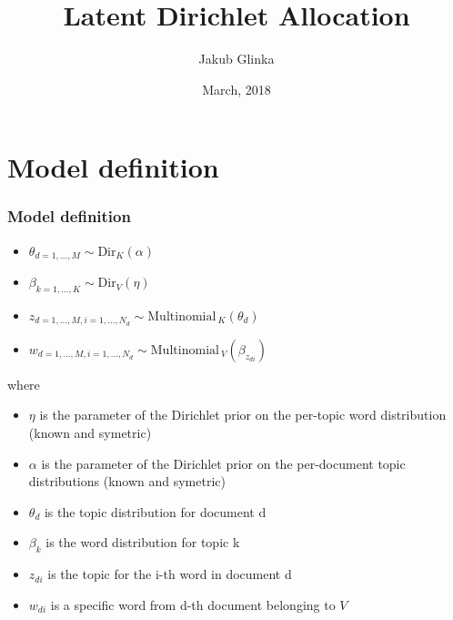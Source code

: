\documentclass[10pt]{beamer}
\title{Latent Dirichlet Allocation}
\author{Jakub Glinka}
\date{March, 2018}
\begin{document}

\begin{frame}
\titlepage
\end{frame}


\section{Model definition}


\begin{frame}
\frametitle{Model definition}

\begin{itemize}
 \item $\theta_{d=1,...,M} \sim \mathrm{Dir}_K(\alpha)$
 \item $\beta_{k=1,...,K} \sim \mathrm{Dir}_V(\eta)$
 \item $z_{d=1,...,M,i=1,...,N_d} \sim \mathrm{Multinomial}_{ \ K}(\theta_d)$
 \item $w_{d=1,...,M,i=1,...,N_d} \sim \mathrm{Multinomial}_{ \ V}(\beta_{z_{di}})$
\end{itemize}

where

\begin{itemize}
 \item $\eta$ is the parameter of the Dirichlet prior on the per-topic word distribution (known and symetric)
 \item $\alpha$ is the parameter of the Dirichlet prior on the per-document topic distributions (known and symetric)
 \item $\theta_d$ is the topic distribution for document d
 \item $\beta_k$ is the word distribution for topic k
 \item $z_{di}$ is the topic for the i-th word in document d
 \item $w_{di}$ is a specific word from d-th document belonging to $V$
\end{itemize}

\end{frame}

\end{document}
